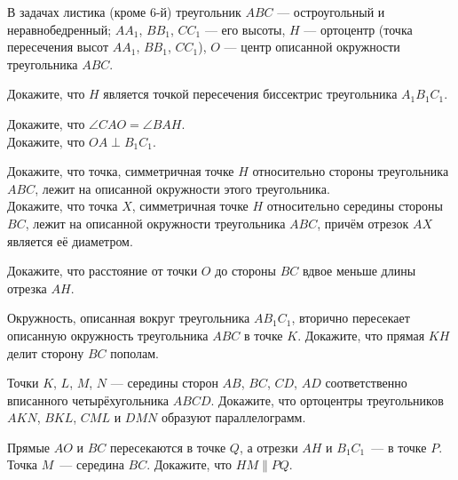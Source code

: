 \resetproblem \begingroup %
    \def\jeolmdate{19 октября 2018 г.}%
    \def\jeolmauthors{Доледёнок~А.\,В., Орлов~О.\,П.}%
\jeolmheader \endgroup


\noindent
В задачах листика (кроме 6-й) треугольник $ABC$ --- остроугольный и неравнобедренный; $AA_1$, $BB_1$, $CC_1$ --- его высоты, $H$ --- ортоцентр (точка пересечения высот $AA_1$, $BB_1$, $CC_1$), $O$ --- центр описанной окружности треугольника $ABC$. \\

\begin{problems}

\item
Докажите, что $H$ является точкой пересечения биссектрис треугольника $A_1B_1C_1$.

\item
\subproblem
Докажите, что $\angle{CAO} = \angle{BAH}$. \\
\subproblem
Докажите, что $OA \perp B_1C_1$.

\item 
\subproblem 
Докажите, что точка, симметричная точке $H$ относительно стороны треугольника $ABC$, лежит на описанной окружности этого треугольника. \\ 
\subproblem
Докажите, что точка $X$, симметричная точке $H$ относительно середины стороны $BC$, лежит на описанной окружности треугольника $ABC$, причём отрезок $AX$ является её диаметром.

\item 
Докажите, что расстояние от точки $O$ до стороны $BC$ вдвое меньше длины отрезка $AH$.

\item
Окружность, описанная вокруг треугольника $AB_1C_1$, вторично пересекает описанную окружность треугольника $ABC$ в точке $K$. Докажите, что прямая $KH$ делит сторону $BC$ пополам.

\item
Точки $K$, $L$, $M$, $N$ --- середины сторон $AB$, $BC$, $CD$, $AD$ соответственно вписанного четырёхугольника $ABCD$. Докажите, что ортоцентры треугольников $AKN$, $BKL$, $CML$ и $DMN$ образуют параллелограмм.

\item
Прямые $AO$ и $BC$ пересекаются в точке $Q$, а отрезки $AH$ и $B_1C_1$~--- в точке $P$. Точка $M$~--- середина $BC$. Докажите, что $HM \parallel PQ$.

\end{problems}


